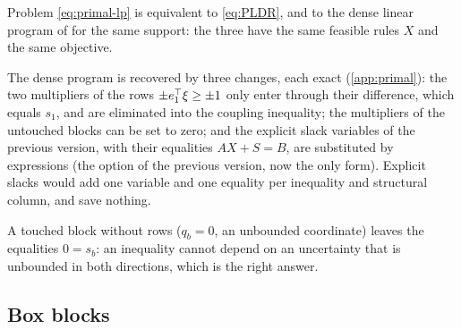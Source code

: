 \begin{corollary}
\label{cor:primal-dense}
Problem \eqref{eq:primal-lp} is equivalent to \eqref{eq:PLDR}, and to the dense linear program of \citet[(4.2)]{KWG2011} for the same support:
the three have the same feasible rules $X$ and the same objective.
\end{corollary}

The dense program is recovered by three changes, each exact (\cref{app:primal}):
the two multipliers of the rows $\pm e_1^\top\xi \ge \pm 1$ only enter through their difference, which equals $s_1$, and are eliminated into the coupling inequality;
the multipliers of the untouched blocks can be set to zero;
and the explicit slack variables of the previous version, with their equalities $AX + S = B$, are substituted by expressions (the option  of the previous version, now the only form).
Explicit slacks would add one variable and one equality per inequality and structural column, and save nothing.

A touched block without rows ($q_b = 0$, an unbounded coordinate) leaves the equalities $0 = s_b$:
an inequality cannot depend on an uncertainty that is unbounded in both directions, which is the right answer.

\subsection{Box blocks}

